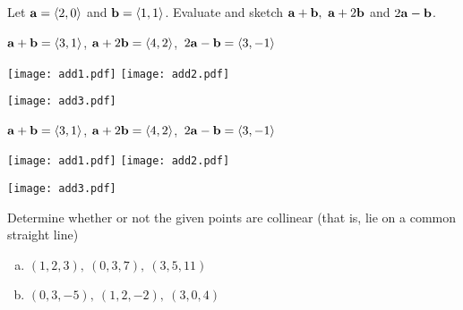 


\subsection*{\Conceptual}

\begin{question}
Let $\mathbf{a}=\left< 2,0\right> $ and $\mathbf{b}=\left< 1,1\right> $. Evaluate and sketch
$\mathbf{a}+\mathbf{b},\ \mathbf{a}+2\mathbf{b}$ and $2\mathbf{a}-\mathbf{b}$.
\end{question}


\begin{answer}
$\mathbf{a}+\mathbf{b}=\left< 3,1\right> $, $\mathbf{a}+2\mathbf{b}=\left< 4,2\right> $,\ 
$2\mathbf{a}-\mathbf{b}=\left< 3,-1\right> $

\begin{center}
     \texttt{[image: add1.pdf]}\qquad
     \texttt{[image: add2.pdf]}
\end{center}
\begin{center}
     \texttt{[image: add3.pdf]}
\end{center}

\end{answer}

\begin{solution}
$\mathbf{a}+\mathbf{b}=\left< 3,1\right> $, $\mathbf{a}+2\mathbf{b}=\left< 4,2\right> $,\ 
$2\mathbf{a}-\mathbf{b}=\left< 3,-1\right> $

\begin{center}
     \texttt{[image: add1.pdf]}\qquad
     \texttt{[image: add2.pdf]}
\end{center}
\begin{center}
     \texttt{[image: add3.pdf]}
\end{center}

\end{solution}

\begin{question}
Determine whether or not the given points are collinear (that is, 
lie on a common straight line)
\begin{enumerate}[(a)]
\item
 $(1,2,3),\ (0,3,7),\ (3,5,11)$

\item
$(0,3,-5),\ (1,2,-2),\ (3,0,4)$
\end{enumerate}
\end{question}

